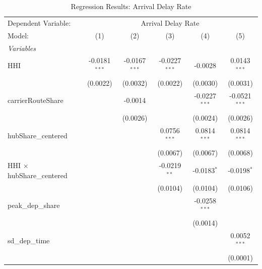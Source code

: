 \documentclass[preprint,12pt,authoryear]{elsarticle}
\begin{document}
\FloatBarrier
\begin{table}[htbp]
   \caption{\label{tab:Reg2} Regression Results: Arrival Delay Rate}
   \centering
   \begin{tabular}{lccccc}
      \tabularnewline \midrule \midrule
      Dependent Variable: & \multicolumn{5}{c}{Arrival Delay Rate}\\
      Model:                            & (1)             & (2)             & (3)             & (4)             & (5)\\  
      \midrule
      \emph{Variables}\\
      HHI                               & -0.0181$^{***}$ & -0.0167$^{***}$ & -0.0227$^{***}$ & -0.0028         & 0.0143$^{***}$\\   
                                        & (0.0022)        & (0.0032)        & (0.0022)        & (0.0030)        & (0.0031)\\   
      carrierRouteShare                 &                 & -0.0014         &                 & -0.0227$^{***}$ & -0.0521$^{***}$\\   
                                        &                 & (0.0026)        &                 & (0.0024)        & (0.0026)\\   
      hubShare\_centered                &                 &                 & 0.0756$^{***}$  & 0.0814$^{***}$  & 0.0814$^{***}$\\   
                                        &                 &                 & (0.0067)        & (0.0067)        & (0.0068)\\   
      HHI $\times$ hubShare\_centered   &                 &                 & -0.0219$^{**}$  & -0.0183$^{*}$   & -0.0198$^{*}$\\   
                                        &                 &                 & (0.0104)        & (0.0104)        & (0.0106)\\   
      peak\_dep\_share                  &                 &                 &                 & -0.0258$^{***}$ &   \\   
                                        &                 &                 &                 & (0.0014)        &   \\   
      sd\_dep\_time                     &                 &                 &                 &                 & 0.0052$^{***}$\\   
                                        &                 &                 &                 &                 & (0.0001)\\   

\end{tabular}
\end{table}
\end{document}

